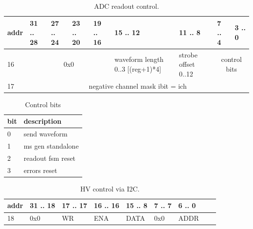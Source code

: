 \documentclass{article}
\begin{document}
\begin{table}[H]
\centering
\begin{tabular}{| l | l | l | l | l | l | l | l | l |}
\hline
addr & 31 .. 28 & 27 .. 24 & 23 .. 20 & 19 .. 16 & 15 .. 12 & 11 .. 8 & 7 .. 4 & 3 .. 0 \\ \hline
16 & \multicolumn{4}{c|}{0x0} & waveform length 0..3 [(reg+1)*4] & strobe offset 0..12 & \multicolumn{2}{c|}{control bits} \\ \hline
17 & \multicolumn{8}{c|}{negative channel mask ibit = ich} \\ \hline
\end{tabular}
\caption{ADC readout control.\label{tab3}}
\end{table}

\begin{table}[H]
\centering
\begin{tabular}{| l | l |}
\hline
bit & description \\ \hline
0 & send waveform \\ \hline
1 & ms gen standalone \\ \hline
2 & readout fsm reset \\ \hline
3 & errors reset \\ \hline
\end{tabular}
\caption{Control bits\label{tab4}}
\end{table}


\begin{table}[H]
\centering
\begin{tabular}{| l | l | l | l | l | l | l | l | l |}
\hline
addr & 31 .. 18 & 17 .. 17 & 16 .. 16 & 15 .. 8 & 7 .. 7 & 6 .. 0 \\ \hline
18 & 0x0 & WR & ENA & DATA & 0x0 & ADDR \\ \hline
\end{tabular}
\caption{HV control via I2C.\label{tab5}}
\end{table}
\end{document}
